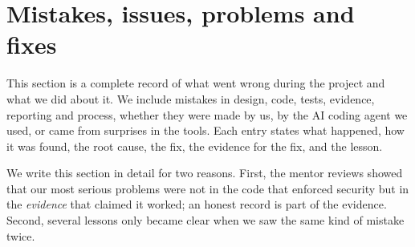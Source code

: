 \section{Mistakes, issues, problems and fixes}
\label{sec:mistakes}

This section is a complete record of what went wrong during the project and what we did about it. We include mistakes in design, code, tests, evidence, reporting and process, whether they were made by us, by the AI coding agent we used, or came from surprises in the tools. Each entry states what happened, how it was found, the root cause, the fix, the evidence for the fix, and the lesson.

We write this section in detail for two reasons. First, the mentor reviews showed that our most serious problems were not in the code that enforced security but in the \emph{evidence} that claimed it worked; an honest record is part of the evidence. Second, several lessons only became clear when we saw the same kind of mistake twice.

